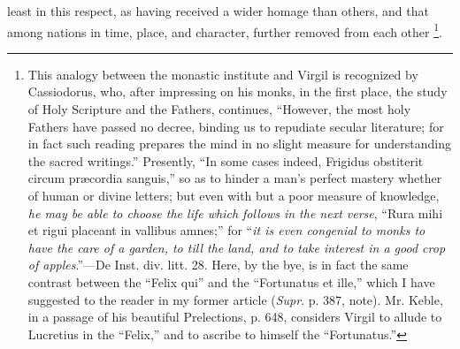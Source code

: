 least in this respect, as having received a wider homage than others,
and that among nations in time, place, and character, further removed
from each other \footnote{This analogy
between the monastic institute and Virgil is recognized by Cassiodorus,
who, after impressing on his monks, in the first place, the study of
Holy Scripture and the Fathers, continues, ``However, the most
holy Fathers have passed no decree, binding us to repudiate secular
literature; for in fact such reading prepares the mind in no slight
measure for understanding the sacred writings.'' Presently,
``In some cases indeed, Frigidus obstiterit circum præcordia
sanguis,'' so as to hinder a man's perfect mastery whether of
human or divine letters; but even with but a poor measure of
knowledge, \emph{he may be able to choose the life which follows in the
next verse}, ``Rura mihi et rigui placeant in vallibus amnes;''
for ``\emph{it is even congenial to monks to have the care of a
garden, to till the land, and to take interest in a good crop of
apples}.''—De Inst. div. litt. 28. Here, by the bye, is in
fact the same contrast between the ``Felix qui'' and the
``Fortunatus et ille,'' which I have suggested to the reader
in my former article (\emph{Supr}. p. 387, note). Mr. Keble, in a
passage of his beautiful Prelections, p. 648, considers Virgil to
allude to Lucretius in the ``Felix,'' and to ascribe to
himself the ``Fortunatus.''}.

